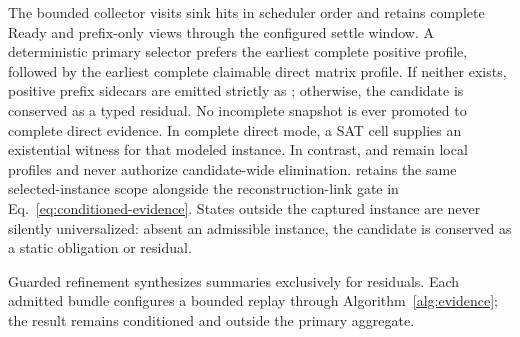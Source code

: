 The bounded collector visits sink hits in scheduler order and retains complete Ready and prefix-only views through the configured settle window. A deterministic primary selector prefers the earliest complete positive profile, followed by the earliest complete claimable direct matrix profile. If neither exists, positive prefix sidecars are emitted strictly as \psat; otherwise, the candidate is conserved as a typed residual. No incomplete snapshot is ever promoted to complete direct evidence. In complete direct mode, a SAT cell supplies an existential witness for that modeled instance. In contrast, \mfilt and \nms remain local profiles and never authorize candidate-wide elimination. \ctsat retains the same selected-instance scope alongside the reconstruction-link gate in Eq.~\ref{eq:conditioned-evidence}. States outside the captured instance are never silently universalized: absent an admissible instance, the candidate is conserved as a static obligation or residual.

Guarded refinement synthesizes summaries exclusively for residuals. Each admitted bundle configures a bounded replay through Algorithm~\ref{alg:evidence}; the result remains conditioned and outside the primary aggregate.
